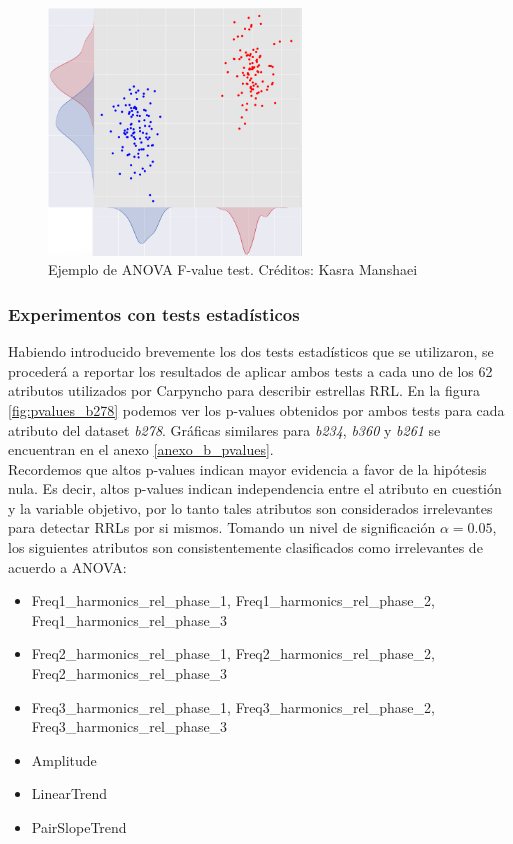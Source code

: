 \begin{figure}[h!]
\centering
  \includegraphics[width=0.6\textwidth]{Kap6/anova_example.png}
\caption{ Ejemplo de ANOVA F-value test. Créditos: Kasra Manshaei }
\label{fig:anova_example}
\end{figure}

\subsubsection{Experimentos con tests estadísticos}
\label{experimentos_test_estadisticos}
Habiendo introducido brevemente los dos tests estadísticos que se utilizaron, se procederá a reportar los resultados de aplicar ambos tests a cada uno de los 62 atributos utilizados por Carpyncho para describir estrellas RRL. En la figura \ref{fig:pvalues_b278} podemos ver los p-values obtenidos por ambos tests para cada atributo del dataset \textit{b278}. Gráficas similares para \textit{b234}, \textit{b360} y \textit{b261} se encuentran en el anexo \ref{anexo_b_pvalues}. \\

Recordemos que altos p-values indican mayor evidencia a favor de la hipótesis nula. Es decir, altos p-values indican independencia entre el atributo en cuestión y la variable objetivo, por lo tanto tales atributos son considerados irrelevantes para detectar RRLs por si mismos. Tomando un nivel de significación $\alpha=0.05$, los siguientes atributos son consistentemente clasificados como irrelevantes de acuerdo a ANOVA:

\begin{itemize}
\item Freq1\_harmonics\_rel\_phase\_1, Freq1\_harmonics\_rel\_phase\_2, Freq1\_harmonics\_rel\_phase\_3 

\item Freq2\_harmonics\_rel\_phase\_1, Freq2\_harmonics\_rel\_phase\_2, Freq2\_harmonics\_rel\_phase\_3

\item Freq3\_harmonics\_rel\_phase\_1, Freq3\_harmonics\_rel\_phase\_2, Freq3\_harmonics\_rel\_phase\_3
\item Amplitude
\item LinearTrend
\item PairSlopeTrend
\end{itemize}


